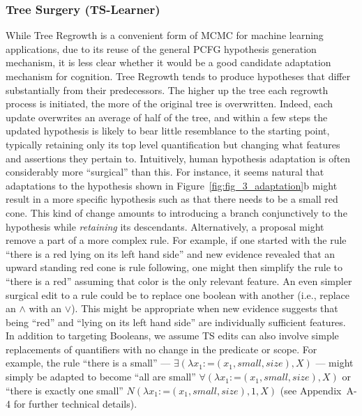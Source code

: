 \documentclass[doc,natbib,floatsintext]{apa7}
\begin{document}
\subsubsection{Tree Surgery (TS-Learner)}
While Tree Regrowth is a convenient form of MCMC for machine learning applications, due to its reuse of the general PCFG hypothesis generation mechanism, it is less clear whether it would be a good candidate adaptation mechanism for cognition. Tree Regrowth tends to produce hypotheses that differ substantially from their predecessors. The higher up the tree each regrowth process is initiated, the more of the original tree is overwritten. Indeed, each update overwrites an average of half of the tree, and within a few steps the updated hypothesis is likely to bear little resemblance to the starting point, typically retaining only its top level quantification but changing what features and assertions they pertain to. Intuitively, human hypothesis adaptation is often considerably more ``surgical'' than this. For instance, it seems natural that adaptations to the hypothesis shown in Figure~\ref{fig:fig_3_adaptation}b might result in a more specific hypothesis such as that there needs to be a small red cone. This kind of change amounts to introducing a branch conjunctively to the hypothesis while \emph{retaining} its descendants. Alternatively, a proposal might remove a part of a more complex rule. For example, if one started with the rule ``there is a red lying on its left hand side'' and new evidence revealed that an upward standing red cone is rule following, one might then simplify the rule to ``there is a red'' assuming that color is the only relevant feature. An even simpler surgical edit to a rule could be to replace one boolean with another (i.e., replace an $\land$ with an $\lor$). This might be appropriate when new evidence suggests that being ``red'' and ``lying on its left hand side'' are individually sufficient features. In addition to targeting Booleans, we assume TS edits can also involve simple replacements of quantifiers with no change in the predicate or scope. For example, the rule ``there is a small'' --- \(\exists(\lambda x_{1}\!:\! \text{=}(x_{1},small,size), X)\) --- might simply be adapted to become ``all are small'' $\forall(\lambda x_{1}\!:\! \text{=}(x_{1}, small,size),X)$ or ``there is exactly one small'' $N(\lambda x_{1}\!:\! \text{=}(x_{1}, small,size),1, X)$ (see Appendix~A-4 for further technical details).
\end{document}
